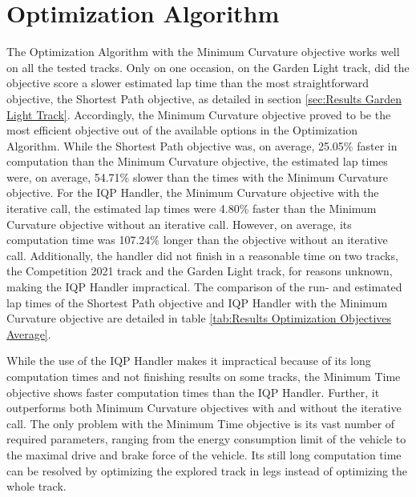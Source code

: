 \section{Optimization Algorithm}
The Optimization Algorithm with the Minimum Curvature objective works well on all the tested tracks. Only on one occasion, on the Garden Light track, did the objective score a slower estimated lap time than the most straightforward objective, the Shortest Path objective, as detailed in section \ref{sec:Results Garden Light Track}. Accordingly, the Minimum Curvature objective proved to be the most efficient objective out of the available options in the Optimization Algorithm. While the Shortest Path objective was, on average, 25.05\% faster in computation than the Minimum Curvature objective, the estimated lap times were, on average, 54.71\% slower than the times with the Minimum Curvature objective. For the IQP Handler, the Minimum Curvature objective with the iterative call, the estimated lap times were 4.80\% faster than the Minimum Curvature objective without an iterative call. However, on average, its computation time was 107.24\% longer than the objective without an iterative call. Additionally, the handler did not finish in a reasonable time on two tracks, the Competition 2021 track and the Garden Light track, for reasons unknown, making the IQP Handler impractical. The comparison of the run- and estimated lap times of the Shortest Path objective and IQP Handler with the Minimum Curvature objective are detailed in table \ref{tab:Results Optimization Objectives Average}.

While the use of the IQP Handler makes it impractical because of its long computation times and not finishing results on some tracks, the Minimum Time objective shows faster computation times than the IQP Handler. Further, it outperforms both Minimum Curvature objectives with and without the iterative call. The only problem with the Minimum Time objective is its vast number of required parameters, ranging from the energy consumption limit of the vehicle to the maximal drive and brake force of the vehicle. Its still long computation time can be resolved by optimizing the explored track in legs instead of optimizing the whole track.

